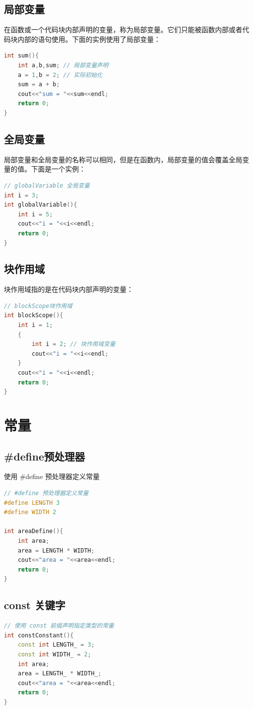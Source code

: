 \documentclass[12pt,twiside,a4paper]{ctexbook}
\numberwithin{chapter}{part}
\begin{document}
\section{局部变量}
在函数或一个代码块内部声明的变量，称为局部变量。它们只能被函数内部或者代码块内部的语句使用。下面的实例使用了局部变量：
\begin{lstlisting}[language=C++]
int sum(){
	int a,b,sum; // 局部变量声明
	a = 1,b = 2; // 实际初始化
	sum = a + b;
	cout<<"sum = "<<sum<<endl;
	return 0;
}
\end{lstlisting}

\section{全局变量}
局部变量和全局变量的名称可以相同，但是在函数内，局部变量的值会覆盖全局变量的值。下面是一个实例：
\begin{lstlisting}[language=C++]
// globalVariable 全局变量
int i = 3;
int globalVariable(){
	int i = 5;
	cout<<"i = "<<i<<endl;
	return 0;
}
\end{lstlisting}

\section{块作用域}
块作用域指的是在代码块内部声明的变量：
\begin{lstlisting}[language=C++]
// blockScope块作用域
int blockScope(){
	int i = 1;
	{
		int i = 2; // 块作用域变量
		cout<<"i = "<<i<<endl;
	}
	cout<<"i = "<<i<<endl;
	return 0;
}
\end{lstlisting}

\chapter{常量}
\section{\#define预处理器}
使用 \#define 预处理器定义常量
\begin{lstlisting}[language=C++]
// #define 预处理器定义常量
#define LENGTH 3
#define WIDTH 2

int areaDefine(){
	int area;
	area = LENGTH * WIDTH;
	cout<<"area = "<<area<<endl;
	return 0;
}
\end{lstlisting}

\section{const 关键字}
\begin{lstlisting}[language=C++]
// 使用 const 前缀声明指定类型的常量
int constConstant(){
	const int LENGTH_ = 3;
	const int WIDTH_ = 2;
	int area;
	area = LENGTH_ * WIDTH_;
	cout<<"area = "<<area<<endl; 
	return 0;
}
\end{lstlisting}
\end{document}
